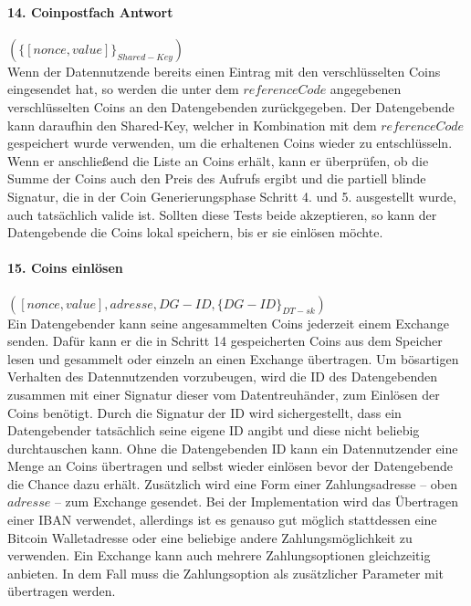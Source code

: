 \documentclass[
	fontsize=12pt,
	headings=small,
	parskip=half,           %
	bibliography=totoc,
	numbers=noenddot,       %
	open=any,               %
]{scrreprt}
\begin{document}
\paragraph{14. Coinpostfach Antwort} $(\{[nonce,value]\}_{Shared-Key})$\\
Wenn der Datennutzende bereits einen Eintrag mit den verschlüsselten Coins eingesendet hat, so werden die unter dem $referenceCode$ angegebenen verschlüsselten Coins an den Datengebenden zurückgegeben. Der Datengebende kann daraufhin den Shared-Key, welcher in Kombination mit dem $referenceCode$ gespeichert wurde verwenden, um die erhaltenen Coins wieder zu entschlüsseln. Wenn er anschließend die Liste an Coins erhält, kann er überprüfen, ob die Summe der Coins auch den Preis des Aufrufs ergibt und die partiell blinde Signatur, die in der Coin Generierungsphase Schritt 4. und 5. ausgestellt wurde, auch tatsächlich valide ist. Sollten diese Tests beide akzeptieren, so kann der Datengebende die Coins lokal speichern, bis er sie einlösen möchte.

\paragraph{15. Coins einlösen} $([nonce,value], adresse, DG-ID, \{DG-ID\}_{DT-sk})$\\
Ein Datengebender kann seine angesammelten Coins jederzeit einem Exchange senden. Dafür kann er die in Schritt 14 gespeicherten Coins aus dem Speicher lesen und gesammelt oder einzeln an einen Exchange übertragen. Um bösartigen Verhalten des Datennutzenden vorzubeugen, wird die ID des Datengebenden zusammen mit einer Signatur dieser vom Datentreuhänder, zum Einlösen der Coins benötigt. Durch die Signatur der ID wird sichergestellt, dass ein Datengebender tatsächlich seine eigene ID angibt und diese nicht beliebig durchtauschen kann. Ohne die Datengebenden ID kann ein Datennutzender eine Menge an Coins übertragen und selbst wieder einlösen bevor der Datengebende die Chance dazu erhält. Zusätzlich wird eine Form einer Zahlungsadresse -- oben $adresse$ -- zum Exchange gesendet. Bei der Implementation wird das Übertragen einer IBAN verwendet, allerdings ist es genauso gut möglich stattdessen eine Bitcoin Walletadresse oder eine beliebige andere Zahlungsmöglichkeit zu verwenden. Ein Exchange kann auch mehrere Zahlungsoptionen gleichzeitig anbieten. In dem Fall muss die Zahlungsoption als zusätzlicher Parameter mit übertragen werden.
\end{document}
